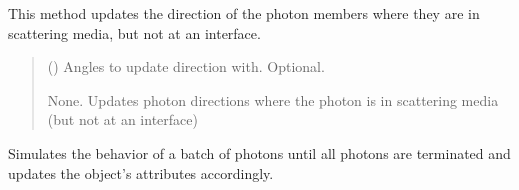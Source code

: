 \documentclass[letterpaper,10pt,english]{sphinxmanual}
\begin{document}
\begin{fulllineitems}
\begin{fulllineitems}
\label{\detokenize{generated/photon_canon.optics:photon_canon.optics.Photon.scatter}}
\pysigstartsignatures
\pysiglinewithargsret
{}
{}
{}
\pysigstopsignatures
\sphinxAtStartPar
This method updates the direction of the photon members where they are in scattering media, but not at an
interface.
\begin{quote}\begin{description}
\sphinxAtStartPar
{} (\sphinxstyleliteralemphasis{\sphinxupquote{{[}}}\sphinxstyleliteralemphasis{\sphinxupquote{, }}\sphinxstyleliteralemphasis{\sphinxupquote{{]} }}\sphinxstyleliteralemphasis{\sphinxupquote{| }}\sphinxstyleliteralemphasis{\sphinxupquote{{[}}}\sphinxstyleliteralemphasis{\sphinxupquote{{[}}}\sphinxstyleliteralemphasis{\sphinxupquote{, }}\sphinxstyleliteralemphasis{\sphinxupquote{{]}}}\sphinxstyleliteralemphasis{\sphinxupquote{{]}}}) \textendash{} Angles to update direction with. Optional.

\sphinxAtStartPar
None. Updates photon directions where the photon is in scattering media (but not at an interface)

\end{description}\end{quote}

\end{fulllineitems}


\begin{fulllineitems}
\label{\detokenize{generated/photon_canon.optics:photon_canon.optics.Photon.simulate}}
\pysigstartsignatures
\pysiglinewithargsret
{}
{}
{}
\pysigstopsignatures
\sphinxAtStartPar
Simulates the behavior of a batch of photons until all photons are terminated and updates the object’s
attributes accordingly.


\end{fulllineitems}
\end{fulllineitems}
\end{document}
